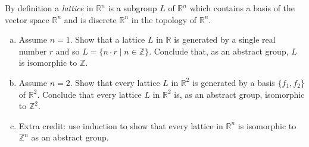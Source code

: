 \documentclass{article}
\newcounter{Problem}
\newenvironment{Problem}{\begin{Exercise}[name={Problem},
                                          counter={Problem}]}
                        {\end{Exercise}}
\begin{document}
\pagebreak

\begin{Problem}
By definition a \emph{lattice} in $\mathbb{R}^n$ is a subgroup $L$ of
$\mathbb{R}^n$ which contains a basis of the vector space
$\mathbb{R}^n$ and is discrete
$\mathbb{R}^n$ in the topology of $\mathbb{R}^n$.
\begin{enumerate}[(a)]
  \item{
    Assume $n = 1$. Show that a lattice $L$ in $\mathbb{R}$ is
    generated by a single real number $r$ and so
    $L = \{ n \cdot r \mid n \in \mathbb{Z} \}$. Conclude that, as an
    abstract group, $L$ is isomorphic to $\mathbb{Z}$.
  }
  \item{
    Assume $n = 2$. Show that every lattice $L$ in $\mathbb{R}^2$ is
    generated by a basis $\{f_1, f_2\}$ of $\mathbb{R}^2$. Conclude
    that every lattice $L$ in $\mathbb{R}^2$ is, as an abstract group,
    isomorphic to $\mathbb{Z}^2$.
  }
  \item{
    Extra credit: use induction to show that every lattice in
    $\mathbb{R}^n$ is isomorphic to $\mathbb{Z}^n$ as an abstract group.
  }
\end{enumerate}
\end{Problem}
\end{document}
